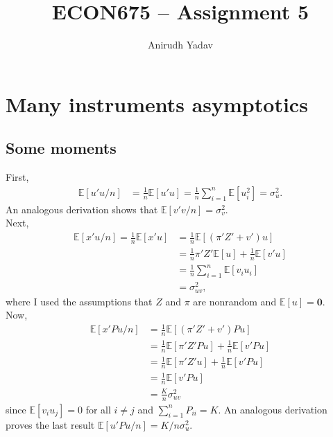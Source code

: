 \documentclass[12pt]{article}
\title{ECON675 -- Assignment 5}
\author{Anirudh Yadav}
\newcommand{\E}{\mathbb{E}}
\newcommand{\mtx}[1]{\ensuremath{\bm{\mathit{#1}}}}
\begin{document}
\maketitle

\setcounter{tocdepth}{2}
\tableofcontents

\newpage

\section{Many instruments asymptotics}

\subsection{Some moments}
First,
\begin{align*}
\E[\mtx{u}'\mtx{u}/n] &= \frac{1}{n} \E[\mtx{u}'\mtx{u}]= \frac{1}{n} \sum_{i=1}^n \E[u_i^2] = \sigma^2_u.
\end{align*}
An analogous derivation shows that $\E[\mtx{v}'\mtx{v}/n] = \sigma^2_v$. \\

Next,
\begin{align*}
\E[\mtx{x}'\mtx{u}/n]= \frac{1}{n} \E[\mtx{x}'\mtx{u}]&=  \frac{1}{n} \E[(\mtx{\pi}'\mtx{Z}'+\mtx{v}')\mtx{u}]\\
&=\frac{1}{n}\mtx{\pi}'\mtx{Z}'\E[\mtx{u}]+\frac{1}{n}\E[\mtx{v}'\mtx{u}]\\
&= \frac{1}{n} \sum_{i=1}^n \E[v_iu_i]\\
&= \sigma^2_{uv},
\end{align*}
where I used the assumptions that $\mtx{Z}$ and $\mtx{\pi}$ are nonrandom and $\E[\mtx{u}] = \bm{0}$.\\

Now,
\begin{align*}
\E[\mtx{x}'\mtx{P}\mtx{u}/n] &= \frac{1}{n}\E[(\mtx{\pi}'\mtx{Z}'+\mtx{v}')\mtx{P}\mtx{u}]\\
&=\frac{1}{n}\E[\mtx{\pi}'\mtx{Z}'\mtx{P}\mtx{u}]+\frac{1}{n}\E[\mtx{v}'\mtx{P}\mtx{u}]\\
&=\frac{1}{n}\E[\mtx{\pi}'\mtx{Z}'\mtx{u}]+\frac{1}{n}\E[\mtx{v}'\mtx{P}\mtx{u}]\\
&=\frac{1}{n}\E[\mtx{v}'\mtx{P}\mtx{u}]\\
&= \frac{K}{n}\sigma^2_{uv}
\end{align*}
since $\E[v_iu_j] = 0$ for all $i\neq j$ and $\sum_{i=1}^n P_{ii} = K$. An analogous derivation proves the last result $\E[\mtx{u}'\mtx{P}\mtx{u}/n] = K/n \sigma^2_u$.
\end{document}
